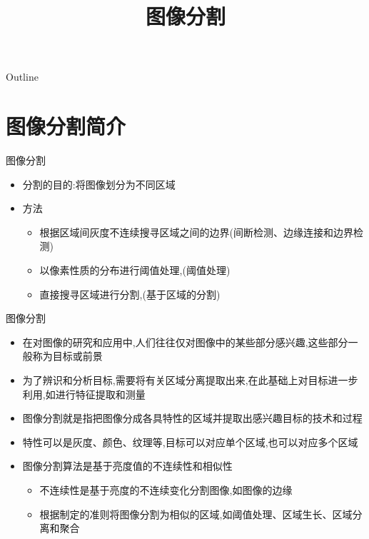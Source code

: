 \documentclass[presentation]{beamer}
\date{}
\title{图像分割}
\begin{document}
\maketitle
\begin{frame}{Outline}
\tableofcontents
\end{frame}











\section{图像分割简介}
\label{sec:orga568d32}

\begin{frame}[label={sec:orgb89459e}]{图像分割}
\begin{itemize}
\item 分割的目的:将图像划分为不同区域
\item 方法
\begin{itemize}
\item 根据区域间灰度不连续搜寻区域之间的边界(间断检测、边缘连接和边界检测)
\item 以像素性质的分布进行阈值处理,(阈值处理)
\item 直接搜寻区域进行分割,(基于区域的分割)
\end{itemize}
\end{itemize}
\end{frame}

\begin{frame}[label={sec:org9484e85}]{图像分割}
\begin{itemize}
\item 在对图像的研究和应用中,人们往往仅对图像中的某些部分感兴趣,这些部分一般称为目标或前景
\item 为了辨识和分析目标,需要将有关区域分离提取出来,在此基础上对目标进一步利用,如进行特征提取和测量
\item 图像分割就是指把图像分成各具特性的区域并提取出感兴趣目标的技术和过程
\item 特性可以是灰度、颜色、纹理等,目标可以对应单个区域,也可以对应多个区域
\item 图像分割算法是基于亮度值的不连续性和相似性
\begin{itemize}
\item 不连续性是基于亮度的不连续变化分割图像,如图像的边缘
\item 根据制定的准则将图像分割为相似的区域,如阈值处理、区域生长、区域分离和聚合
\end{itemize}
\end{itemize}
\end{frame}
\end{document}
